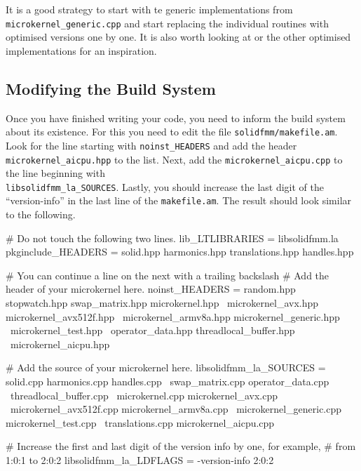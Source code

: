 \documentclass{scrbook}
\begin{document}
It is a good strategy to start with te generic implementations from
\lstinline|microkernel_generic.cpp| and start replacing the individual
routines with optimised versions one by one. It is also worth looking
at or the other optimised implementations for an inspiration.

\subsection{Modifying the Build System}
Once you have finished writing your code, you need to inform the build system
about its existence. For this you need to edit the file
\lstinline|solidfmm/makefile.am|. Look for the line starting with
\lstinline|noinst_HEADERS| and add the header \lstinline|microkernel_aicpu.hpp|
to the list. Next, add the \lstinline|microkernel_aicpu.cpp| to the line
beginning with\\ \lstinline|libsolidfmm_la_SOURCES|. Lastly, you should increase
the last digit of the \enquote{version-info} in the last line of the
\lstinline|makefile.am|. The result should look similar to the following.
\begin{commandshell*}
# Do not touch the following two lines.
lib_LTLIBRARIES = libsolidfmm.la
pkginclude_HEADERS = solid.hpp harmonics.hpp translations.hpp handles.hpp


# You can continue a line on the next with a trailing backslash
# Add the header of your microkernel here.
noinst_HEADERS = random.hpp stopwatch.hpp swap_matrix.hpp microkernel.hpp \
                 microkernel_avx.hpp microkernel_avx512f.hpp              \
                 microkernel_armv8a.hpp microkernel_generic.hpp           \
                 microkernel_test.hpp                                     \
                 operator_data.hpp threadlocal_buffer.hpp                 \
                 microkernel_aicpu.hpp

# Add the source of your microkernel here.
libsolidfmm_la_SOURCES = solid.cpp harmonics.cpp handles.cpp             \
                         swap_matrix.cpp operator_data.cpp               \
                         threadlocal_buffer.cpp                          \
                         microkernel.cpp microkernel_avx.cpp             \
                         microkernel_avx512f.cpp microkernel_armv8a.cpp  \
                         microkernel_generic.cpp microkernel_test.cpp    \
                         translations.cpp microkernel_aicpu.cpp
                      
# Increase the first and last digit of the version info by one, for example,
# from 1:0:1 to 2:0:2
libsolidfmm_la_LDFLAGS = -version-info 2:0:2
\end{commandshell*}
\end{document}
